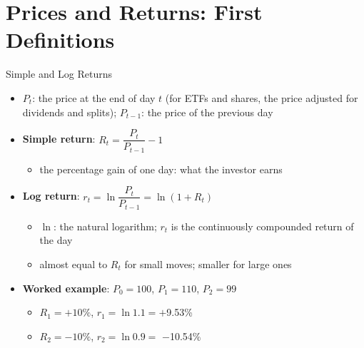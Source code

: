\section{Prices and Returns: First Definitions}

\begin{frame}{Simple and Log Returns}
\itemsize{\small}
\begin{itemize}
    \item $P_t$: the price at the end of day $t$ (for ETFs and shares, the price adjusted for dividends and splits); $P_{t-1}$: the price of the previous day
    \item \textbf{Simple return}: $R_t = \dfrac{P_t}{P_{t-1}} - 1$
    \begin{itemize}
        \item the percentage gain of one day: what the investor earns
    \end{itemize}
    \item \textbf{Log return}: $r_t = \ln \dfrac{P_t}{P_{t-1}} = \ln(1 + R_t)$
    \begin{itemize}
        \item $\ln$: the natural logarithm; $r_t$ is the continuously compounded return of the day
        \item almost equal to $R_t$ for small moves; smaller for large ones
    \end{itemize}
    \item \textbf{Worked example}: $P_0 = 100$, $P_1 = 110$, $P_2 = 99$
    \begin{itemize}
        \item $R_1 = +10\%$, $r_1 = \ln 1.1 = +$9.53\%
        \item $R_2 = -10\%$, $r_2 = \ln 0.9 = $ \ensuremath{-}10.54\%
    \end{itemize}
\end{itemize}
\end{frame}

